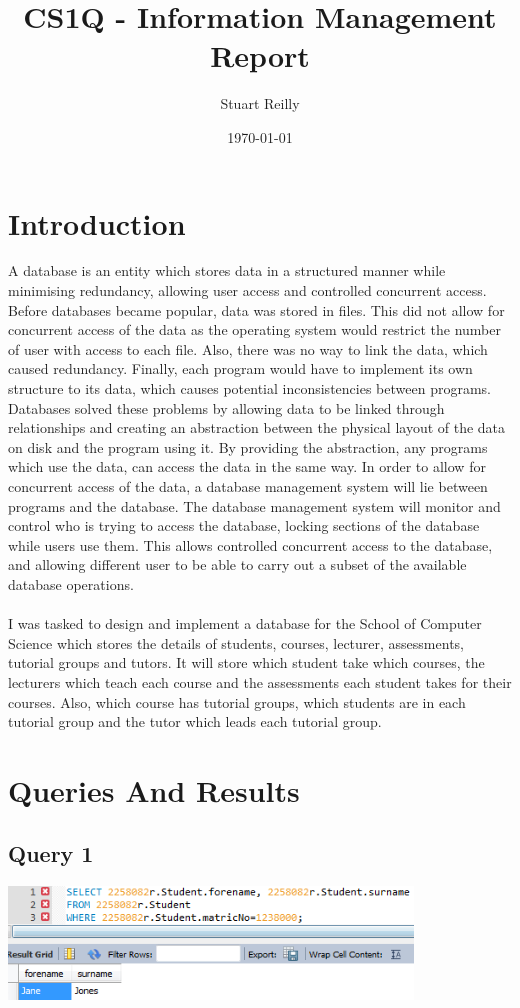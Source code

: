 \documentclass[12pt]{article}
\author{Stuart Reilly}
\date{\today}
\title{CS1Q - Information Management Report}
\begin{document}
\maketitle

\newpage
\tableofcontents

\newpage

\section{Introduction}
A database is an entity which stores data in a structured manner while minimising redundancy, allowing user access and controlled concurrent access.
Before databases became popular, data was stored in files.
This did not allow for concurrent access of the data as the operating system would restrict the number of user with access to each file.
Also, there was no way to link the data, which caused redundancy.
Finally, each program would have to implement its own structure to its data, which causes potential inconsistencies between programs.
Databases solved these problems by allowing data to be linked through relationships and creating an abstraction between the physical layout of the data on disk and the program using it.
By providing the abstraction, any programs which use the data, can access the data in the same way.
In order to allow for concurrent access of the data, a database management system will lie between programs and the database.
The database management system will monitor and control who is trying to access the database, locking sections of the database while users use them.
This allows controlled concurrent access to the database, and allowing different user to be able to carry out a subset of the available database operations.
\\
\\
I was tasked to design and implement a database for the School of Computer Science which stores the details of students, courses, lecturer, assessments, tutorial groups and tutors.
It will store which student take which courses, the lecturers which teach each course and the assessments each student takes for their courses.
Also, which course has tutorial groups, which students are in each tutorial group and the tutor which leads each tutorial group.

\section{Queries And Results}
\subsection{Query 1}
\includegraphics[width=\linewidth,height=3cm,keepaspectratio]{query/Query1}
\end{document}

